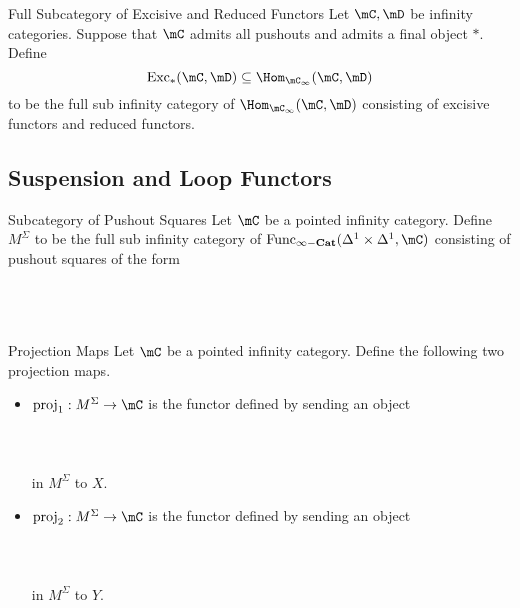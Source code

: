 \documentclass[a4paper]{article}
\begin{document}
\begin{defn}{Full Subcategory of Excisive and Reduced Functors}{} Let $\mC,\mD$ be infinity categories. Suppose that $\mC$ admits all pushouts and admits a final object $\ast$. Define $$\text{Exc}_\ast(\mC,\mD)\subseteq\Hom_{\mC_\infty}(\mC,\mD)$$ to be the full sub infinity category of $\Hom_{\mC_\infty}(\mC,\mD)$ consisting of excisive functors and reduced functors. 
\end{defn}

\subsection{Suspension and Loop Functors}
\begin{defn}{Subcategory of Pushout Squares}{} Let $\mC$ be a pointed infinity category. Define $M^\Sigma$ to be the full sub infinity category of $\text{Func}_\bold{\infty-\bold{Cat}}(\Delta^1\times\Delta^1,\mC)$ consisting of pushout squares of the form \\~\\
\\~\\
\end{defn}

\begin{defn}{Projection Maps}{} Let $\mC$ be a pointed infinity category. Define the following two projection maps. 
\begin{itemize}
\item $\text{proj}_1:M^\Sigma\to\mC$ is the functor defined by sending an object \\~\\
\\~\\
in $M^\Sigma$ to $X$. 
\item $\text{proj}_2:M^\Sigma\to\mC$ is the functor defined by sending an object \\~\\
\\~\\
in $M^\Sigma$ to $Y$. 
\end{itemize}
\end{defn}
\end{document}
